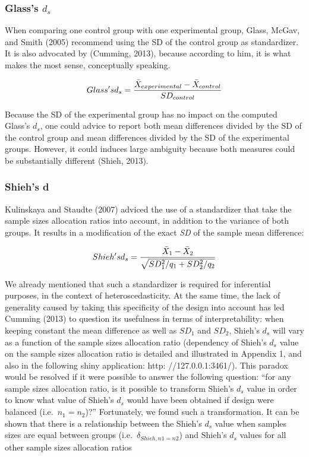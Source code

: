 \documentclass[man]{apa6}
\begin{document}
\hypertarget{glasss-d_s}{%
\subsubsection{\texorpdfstring{Glass's \(d_s\)}{Glass's d\_s}}\label{glasss-d_s}}

When comparing one control group with one experimental group, Glass, McGav, and Smith (2005) recommend using the SD of the control group as standardizer. It is also advocated by (Cumming, 2013), because according to him, it is what makes the most sense, conceptually speaking.

\begin{equation} 
Glass's \space d_s = \frac{\bar{X}_{experimental} - \bar{X}_{control}}{SD_{control}}
\label{eq:Glassds}
\end{equation}

Because the SD of the experimental group has no impact on the computed Glass's \(d_s\), one could advice to report both mean differences divided by the SD of the control group and mean differences divided by the SD of the experimental groups. However, it could induces large ambiguity because both measures could be substantially different (Shieh, 2013).

\hypertarget{shiehs-d}{%
\subsubsection{Shieh's d}\label{shiehs-d}}

Kulinskaya and Staudte (2007) adviced the use of a standardizer that take the sample sizes allocation ratios into account, in addition to the variance of both groups. It results in a modification of the exact \emph{SD} of the sample mean difference:

\begin{equation} 
Shieh's \space d_s = \frac{\bar{X}_1 - \bar{X}_2}{\sqrt{SD_1^2/q_1+SD_2^2/q_2}}
\label{eq:Shiehds}
\end{equation}

We already mentioned that such a standardizer is required for inferential purposes, in the context of heteroscedasticity. At the same time, the lack of generality caused by taking this specificity of the design into account has led Cumming (2013) to question its usefulness in terms of interpretability: when keeping constant the mean difference as well as \(SD_1\) and \(SD_2\), Shieh's \(d_s\) will vary as a function of the sample sizes allocation ratio (dependency of Shieh's \(d_s\) value on the sample sizes allocation ratio is detailed and illustrated in Appendix 1, and also in the following shiny application: http: //127.0.0.1:3461/). This paradox would be resolved if it were possible to answer the following question: \enquote{for any sample sizes allocation ratio, is it possible to transform Shieh's \(d_s\) value in order to know what value of Shieh's \(d_s\) would have been obtained if design were balanced (i.e.~\(n_1 = n_2\))?} Fortunately, we found such a transformation. It can be shown that there is a relationship between the Shieh's \(d_s\) value when samples sizes are equal between groups (i.e.~\(\delta_{Shieh, n1=n2}\)) and Shieh's \(d_s\) values for all other sample sizes allocation ratios
\end{document}
